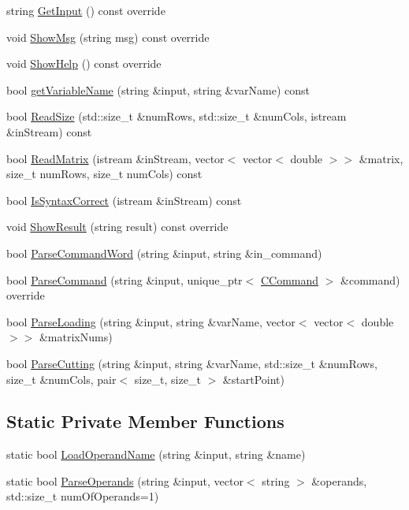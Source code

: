 \begin{DoxyCompactItemize}
\item 
string \hyperlink{classCApplicationConsole_a0af959fae7259bf81f7855985e16adff}{Get\+Input} () const override
\item 
void \hyperlink{classCApplicationConsole_a32152dd2a1793b20fd03ba3179d8e22e}{Show\+Msg} (string msg) const override
\item 
void \hyperlink{classCApplicationConsole_ad9d3e1cdadd2cc2e89dfa3591942f5f3}{Show\+Help} () const override
\item 
bool \hyperlink{classCApplicationConsole_a95f0c288b2224cc1273cf20472cbc34f}{get\+Variable\+Name} (string \&input, string \&var\+Name) const 
\item 
bool \hyperlink{classCApplicationConsole_a1444353413fae5d03ba68a803f724379}{Read\+Size} (std\+::size\+\_\+t \&num\+Rows, std\+::size\+\_\+t \&num\+Cols, istream \&in\+Stream) const 
\item 
bool \hyperlink{classCApplicationConsole_a2323e596b3a019fe843f88955218baba}{Read\+Matrix} (istream \&in\+Stream, vector$<$ vector$<$ double $>$$>$ \&matrix, size\+\_\+t num\+Rows, size\+\_\+t num\+Cols) const 
\item 
bool \hyperlink{classCApplicationConsole_a6ca78c0250dfbdf71a995277c0485e5a}{Is\+Syntax\+Correct} (istream \&in\+Stream) const 
\item 
void \hyperlink{classCApplicationConsole_a4bca66a2f575557ca929d2fa8c8f9028}{Show\+Result} (string result) const override
\item 
bool \hyperlink{classCApplicationConsole_a4ae836d72b1ecdc4b3c3e15ff5f171b6}{Parse\+Command\+Word} (string \&input, string \&in\+\_\+command)
\item 
bool \hyperlink{classCApplicationConsole_ab17d9e0bf16052fff75f721f9aaaafc8}{Parse\+Command} (string \&input, unique\+\_\+ptr$<$ \hyperlink{classCCommand}{C\+Command} $>$ \&command) override
\item 
bool \hyperlink{classCApplicationConsole_a092af2533775a460a05e7c5198d991fa}{Parse\+Loading} (string \&input, string \&var\+Name, vector$<$ vector$<$ double $>$$>$ \&matrix\+Nums)
\item 
bool \hyperlink{classCApplicationConsole_ae3c29fe61ba160f51ead41382df8c494}{Parse\+Cutting} (string \&input, string \&var\+Name, std\+::size\+\_\+t \&num\+Rows, size\+\_\+t \&num\+Cols, pair$<$ size\+\_\+t, size\+\_\+t $>$ \&start\+Point)
\end{DoxyCompactItemize}
\subsection*{Static Private Member Functions}
\begin{DoxyCompactItemize}
\item 
static bool \hyperlink{classCApplicationConsole_a12531e44827274807a3a0787e66345fe}{Load\+Operand\+Name} (string \&input, string \&name)
\item 
static bool \hyperlink{classCApplicationConsole_a00a40d89b87f545373a7ce3d22a7c996}{Parse\+Operands} (string \&input, vector$<$ string $>$ \&operands, std\+::size\+\_\+t num\+Of\+Operands=1)
\end{DoxyCompactItemize}
